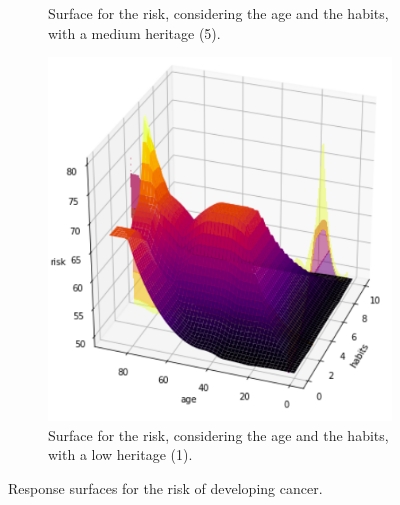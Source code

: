 \begin{figure}[ht]
\begin{subfigure}{.3\textwidth}
  \caption{Surface for the risk, considering the age and the habits, with a medium heritage (5).}
  \label{fig:sur8}
\end{subfigure}
\hspace{10pts}
\begin{subfigure}{.3\textwidth}
  \centering
  \includegraphics[width=.8\linewidth]{figures/habits-age1.png} 
  \caption{Surface for the risk, considering the age and the habits, with a low heritage (1).}
  \label{fig:sur9}
\end{subfigure}
\caption{Response surfaces for the risk of developing cancer.}
\label{fig:surfaces}
\end{figure}
